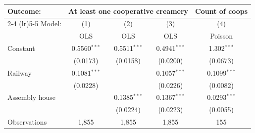 
\begin{tabular}{lcccc}
   \tabularnewline \midrule \midrule
   Outcome: & \multicolumn{3}{c}{At least one cooperative creamery} & Count of coops \\ \cmidrule(lr){2-4} \cmidrule(lr){5-5}
   Model:         & (1)            & (2)            & (3)            & (4)\\  
                  &  OLS           & OLS            & OLS            & Poisson\\  
      \midrule
   Constant       & 0.5560$^{***}$ & 0.5511$^{***}$ & 0.4941$^{***}$ & 1.302$^{***}$\\   
                  & (0.0173)       & (0.0158)       & (0.0200)       & (0.0673)\\   
   Railway        & 0.1081$^{***}$ &                & 0.1057$^{***}$ & 0.1099$^{***}$\\   
                  & (0.0228)       &                & (0.0226)       & (0.0082)\\   
   Assembly house &                & 0.1385$^{***}$ & 0.1367$^{***}$ & 0.0293$^{***}$\\   
                  &                & (0.0224)       & (0.0223)       & (0.0055)\\   
      \midrule
   Observations   & 1,855          & 1,855          & 1,855          & 155\\  
      \midrule
      \midrule
\end{tabular}


